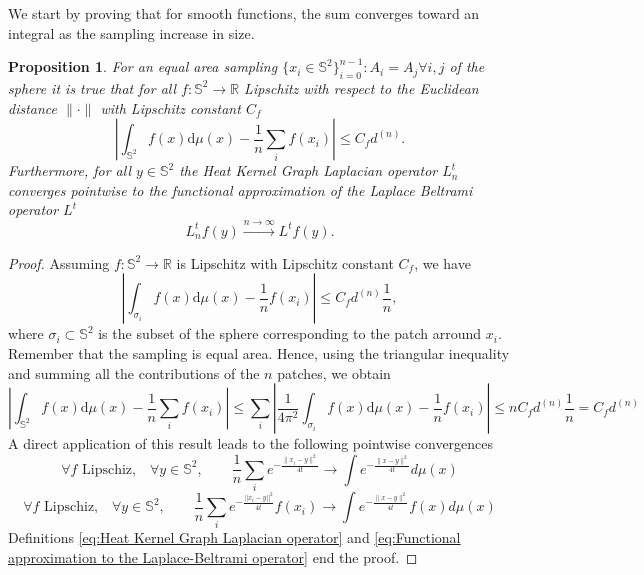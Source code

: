 \documentclass{article} %
\newtheorem{prop}{Proposition}
\newcommand{\R}{\mathbb{R}}
\renewcommand{\S}{\mathbb{S}}
\begin{document}
We start by proving that for smooth functions, the sum converges toward an integral as the sampling increase in size.
\begin{prop}\label{prop:1}
	For an equal area sampling $\{x_i\in\S^2\}_{i=0}^{n-1}: A_i=A_j \forall i,j$ of the sphere it is true that for all $f: \S^2 \rightarrow \R$ Lipschitz with respect to the Euclidean distance $\|\cdot\|$ with Lipschitz constant $C_f$
	\begin{equation*}
	\left| \int_{\S^2}f({ x})\text{d}{\mu(x)} - \frac{1}{n}\sum_i f( x_i)\right|\leq C_f d^{(n)}.	    
	\end{equation*}
	Furthermore, for all $y\in\S^2$ the Heat Kernel Graph Laplacian operator $L^t_n$ converges pointwise to the functional approximation of the Laplace Beltrami operator $L^t$
	\begin{equation*}
	 L_n^tf(y)\xrightarrow{n\to\infty} L^tf(y).
	\end{equation*}
\end{prop}
\begin{proof}

	Assuming $f:\mathbb S^2 \rightarrow \R$ is Lipschitz with Lipschitz constant $C_f$, we have
	\begin{equation*}
	\left| \int_{\sigma_{i}}f({ x})\text{d}{\mu(x)} - \frac{1}{n}f( x_i)\right| \leq C_fd^{(n)}\frac{1}{n},	    
	\end{equation*}
	where $\sigma_i\subset \S^2$ is the subset of the sphere corresponding to the patch arround $x_i$. Remember that the sampling is equal area.
	Hence, using the triangular inequality and summing all the contributions of the $n$ patches, we obtain
	\begin{equation*}
	\left| \int_{\S^2}f({ x})\text{d}{\mu(x)} - \frac{1}{n}\sum_i f( x_i)\right| \leq \sum_i \left| \frac{1}{4\pi^2} \int_{\sigma_{i}}f({ x})\text{d}{\mu(x)} - \frac{1}{n}f( x_i)\right|\leq n  C_fd^{(n)}\frac{1}{n} = C_fd^{(n)}
	\end{equation*}
	A direct application of this result leads to the following pointwise convergences
	\begin{equation*}
	\forall f \text{ Lipschiz,}\quad \forall y\in\S^2,  \quad\quad \frac{1}{n}\sum_i e^{-\frac{\|x_i-y\|^2}{4t}}\rightarrow   \int e^{-\frac{\|x-y\|^2}{4t}}d\mu(x) 
	\end{equation*}
    \begin{equation*}
    \forall f \text{ Lipschiz,}\quad \forall y\in\S^2,  \quad\quad \frac{1}{n}\sum_i e^{-\frac{||x_i-y||^2}{4t}}f(x_i)\rightarrow   \int e^{-\frac{\|x-y\|^2}{4t}}f(x)d\mu(x)        
    \end{equation*}
	Definitions \ref{eq:Heat Kernel Graph Laplacian operator} and \ref{eq:Functional approximation to the Laplace-Beltrami operator} end the proof.
\end{proof}
\end{document}
